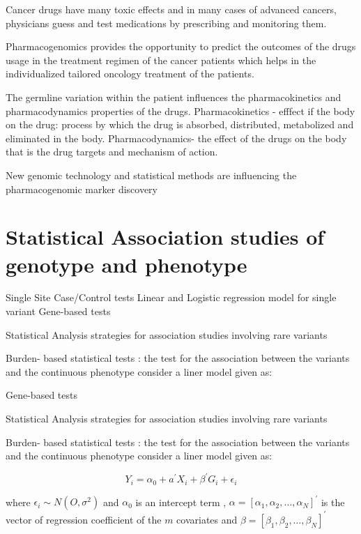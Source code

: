 Cancer drugs have many toxic effects and in many cases of advanced cancers, physicians guess and test medications by prescribing and monitoring them.

Pharmacogenomics provides the opportunity to predict the outcomes of the drugs usage in the treatment regimen of the cancer patients which helps in the individualized tailored oncology treatment of the patients.

The germline variation within the patient influences the pharmacokinetics and pharmacodynamics properties of the drugs. Pharmacokinetics - efffect if the body on the drug: process by which the drug is absorbed, distributed, metabolized and eliminated in the body. Pharmacodynamics- the effect of the drugs on the body that is the drug targets and mechanism of action.

New genomic technology and statistical methods are influencing the pharmacogenomic marker discovery

 
\section{Statistical Association studies of genotype and phenotype}

Single Site Case/Control tests
Linear and Logistic regression model for single variant
Gene-based tests 


Statistical Analysis strategies for association studies involving rare variants



Burden- based statistical tests : the test for the association between the variants and the continuous phenotype  consider a liner model given as:

Gene-based tests 


Statistical Analysis strategies for association studies involving rare variants



Burden- based statistical tests : the test for the association between the variants and the continuous phenotype  consider a liner model given as:

 \begin{equation*}
  Y_i = \alpha_0+ {a}^{'} X_i + {\beta}^{'} G_i+ {\epsilon}_{i}
  \end{equation*}
 
 where  
${\epsilon}_{i} \sim  N(O, {\sigma} ^2)$  and $\alpha_0$ is an intercept term , $\alpha = {[  {\alpha}_{1}, {\alpha}_{2},\dotsc,{\alpha}_{N} ]} ^ {'}$ is the vector of regression coefficient of the $m$ covariates and $\beta = [{\beta}_{1}, {\beta}_{2},\dotsc,{\beta}_{N}] ^{'}$

